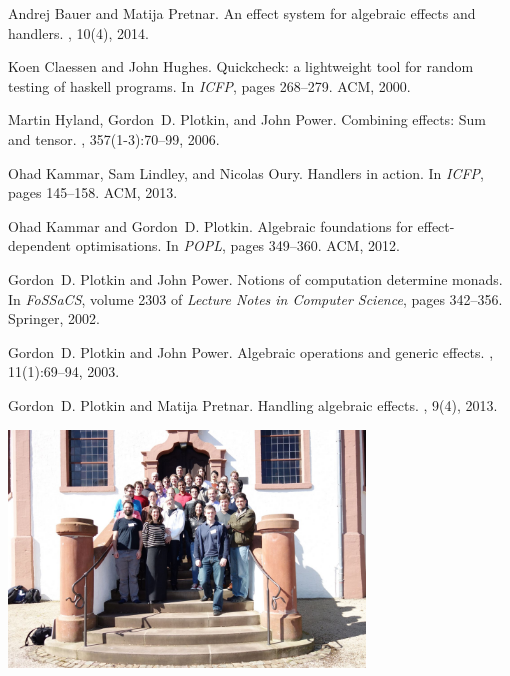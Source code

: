 \documentclass[a4paper,UKenglish]{dagrep}
\begin{document}
% 
% 

\begin{thebibliography}{1}

Andrej Bauer and Matija Pretnar.
\newblock An effect system for algebraic effects and handlers.
, 10(4), 2014.

Koen Claessen and John Hughes.
\newblock Quickcheck: a lightweight tool for random testing of haskell
  programs.
\newblock In {\em {ICFP}}, pages 268--279. {ACM}, 2000.

Martin Hyland, Gordon~D. Plotkin, and John Power.
\newblock Combining effects: Sum and tensor.
, 357(1-3):70--99, 2006.

Ohad Kammar, Sam Lindley, and Nicolas Oury.
\newblock Handlers in action.
\newblock In {\em {ICFP}}, pages 145--158. {ACM}, 2013.

Ohad Kammar and Gordon~D. Plotkin.
\newblock Algebraic foundations for effect-dependent optimisations.
\newblock In {\em {POPL}}, pages 349--360. {ACM}, 2012.

Gordon~D. Plotkin and John Power.
\newblock Notions of computation determine monads.
\newblock In {\em FoSSaCS}, volume 2303 of {\em Lecture Notes in Computer
  Science}, pages 342--356. Springer, 2002.

Gordon~D. Plotkin and John Power.
\newblock Algebraic operations and generic effects.
, 11(1):69--94, 2003.

Gordon~D. Plotkin and Matija Pretnar.
\newblock Handling algebraic effects.
, 9(4), 2013.

\end{thebibliography}


\vfill

\begin{center}
\includegraphics[width=0.71\textwidth]{16112.jpg}
\end{center}
\end{document}
